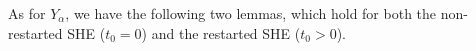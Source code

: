 \documentclass[12pt]{report}
\theoremstyle{plain}
\theoremstyle{definition}
\numberwithin{equation}{section}
\newcommand{\R}{\mathbb{R}}
\newcommand{\Norm}[1]{\left\|  #1   \right\|}
\newcommand{\ud}{\ensuremath{ \mathrm{d} }}
\begin{document}
%
%

As for $Y_\alpha$, we have the following two lemmas, which hold for both the non-restarted SHE ($t_0=0$)
and the restarted SHE ($ t_0>0$).
\end{document}
